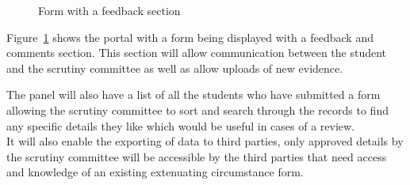 \documentclass[../main.tex]{subfiles}
\begin{document}
	\begin{figure}[H]
        \caption{\label{fig:formandfeedback} Form with a feedback section}
      \end{figure}
      
Figure~\ref{fig:formandfeedback} shows the portal with a form being displayed with a feedback and comments section. This section will allow communication between the student and the scrutiny committee as well as allow uploads of new evidence. 

The panel will also have a list of all the students who have submitted a form allowing the scrutiny committee to sort and search through the records to find any specific details they like which would be useful in cases of a review.\\[2mm]

It will also enable the exporting of data to third parties, only approved details by the scrutiny committee will be accessible by the third parties that need access and knowledge of an existing extenuating circumstance form.
  
\end{document}
